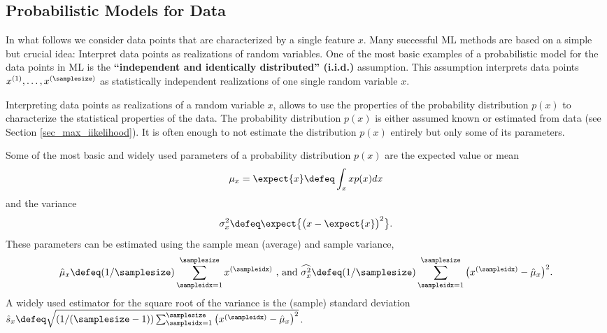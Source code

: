 \documentclass[12pt]{report}
\begin{document}

\subsection{Probabilistic Models for Data} 
In what follows we consider data points that are characterized by a 
single feature $x$. Many successful ML methods are based on a simple 
but crucial idea: Interpret data points as realizations of random variables. 
One of the most basic examples of a probabilistic model for the 
data points in ML is the {\bf ``independent and identically distributed'' (i.i.d.)} 
assumption. This assumption interprets data points $x^{(1)},\ldots,x^{(\samplesize)}$ 
as statistically independent realizations of one single random variable $x$.

Interpreting data points as realizations of a random variable $x$, 
allows to use the properties of the probability distribution $p(x)$ 
to characterize the statistical properties of the data. The probability 
distribution $p(x)$ is either assumed known or estimated from data 
(see Section \ref{sec_max_iikelihood}). It is often enough to not 
estimate the distribution $p(x)$ entirely but only some of its parameters. 

Some of the most basic and widely used parameters of a probability 
distribution $p(x)$ are the expected value or mean 
$$\mu_{x} = \expect\{x\} \defeq \int_{x} x p(x) dx$$ 
and the variance 
$$\sigma_{x}^{2} \defeq \expect\big\{\big(x-\expect\{x\}\big)^{2}\big\}.$$ 
These parameters can be estimated using the sample mean 
(average) and sample variance, 
\begin{equation} 
\hat{\mu}_{x} \defeq (1/\samplesize) \sum_{\sampleidx=1}^{\samplesize} x^{(\sampleidx)}\mbox{ , and } \widehat{\sigma^{2}_{x}} \defeq (1/\samplesize) \sum_{\sampleidx=1}^{\samplesize} \big( x^{(\sampleidx)} - \hat{\mu}_{x} \big)^{2}.  
\end{equation} 
A widely used estimator for the square root of the variance is the 
(sample) standard deviation $\hat{s}_{x} \defeq  \sqrt{(1/(\samplesize-1)) \sum_{\sampleidx=1}^{\samplesize} \big( x^{(\sampleidx)} - \hat{\mu}_{x} \big)^{2}}$. 
\end{document}
